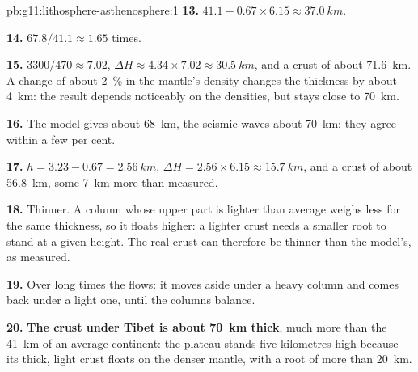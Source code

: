 \begin{solution}{pb:g11:lithosphere-asthenosphere:1}
\textbf{13.} $41.1 - 0.67 \times 6.15 \approx \qty{37.0}{km}$.

\textbf{14.} $67.8/41.1 \approx 1.65$ times.

\textbf{15.} $3300/470 \approx 7.02$, $\Delta H \approx 4.34 \times 7.02
\approx \qty{30.5}{km}$, and a crust of about \qty{71.6}{km}. A change of
about \qty{2}{\percent} in the mantle's density changes the thickness by
about \qty{4}{km}: the result depends noticeably on the densities, but stays
close to \qty{70}{km}.

\textbf{16.} The model gives about \qty{68}{km}, the seismic waves about
\qty{70}{km}: they agree within a few per cent.

\textbf{17.} $h = 3.23 - 0.67 = \qty{2.56}{km}$, $\Delta H = 2.56 \times
6.15 \approx \qty{15.7}{km}$, and a crust of about \qty{56.8}{km}, some
\qty{7}{km} more than measured.

\textbf{18.} Thinner. A column whose upper part is lighter than average
weighs less for the same thickness, so it floats higher: a lighter crust
needs a smaller root to stand at a given height. The real crust can
therefore be thinner than the model's, as measured.

\textbf{19.} Over long times the  flows: it moves aside under
a heavy column and comes back under a light one, until the columns balance.

\textbf{20.} \textbf{The crust under Tibet is about \qty{70}{km} thick}, much
more than the \qty{41}{km} of an average continent: the plateau stands five
kilometres high because its thick, light crust floats on the denser mantle,
with a root of more than \qty{20}{km}.
\end{solution}
